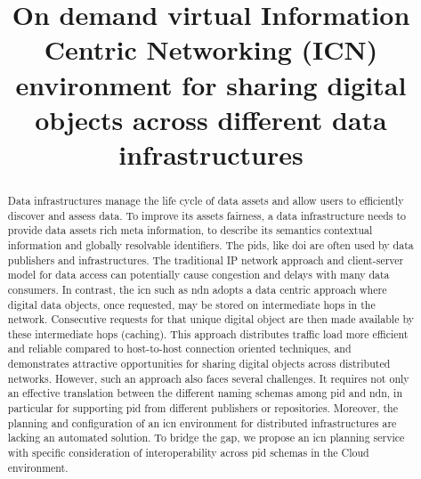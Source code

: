 \documentclass[conference]{IEEEtran}
\begin{document}
\title{On demand virtual Information Centric Networking (ICN) environment for sharing digital objects across different data infrastructures
}

\author{
}

\maketitle

\begin{abstract}
Data infrastructures manage the life cycle of data assets and allow users to efficiently discover and assess data. To improve its assets \gls{fairness}, a data infrastructure needs to provide data assets rich meta information, to describe its semantics contextual information and globally resolvable identifiers. The \glspl{pid}, like \gls{doi} are often used by data publishers and infrastructures. The traditional IP network approach and client-server model for data access can potentially cause congestion and delays with many data consumers. In contrast, the \gls{icn} such as \gls{ndn} adopts a data centric approach where digital data objects, once requested, may be stored on intermediate hops in the network. Consecutive requests for that unique digital object are then made available by these intermediate hops (caching). This approach distributes traffic load more efficient and reliable compared to host-to-host connection oriented techniques, and demonstrates attractive opportunities for sharing digital objects across distributed networks. However, such an approach also faces several challenges. It requires not only an effective translation between the different naming schemas among \gls{pid} and \gls{ndn}, in particular for supporting \gls{pid} from different publishers or repositories. Moreover, the planning and configuration of an \gls{icn} environment for distributed infrastructures are lacking an automated solution. To bridge the gap, we propose an \gls{icn} planning service with specific consideration of interoperability across \gls{pid} schemas in the Cloud environment.


\end{abstract}
\end{document}
